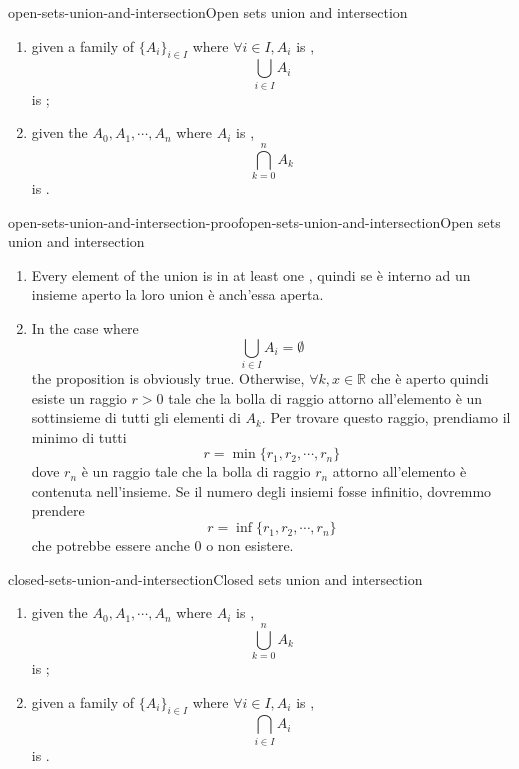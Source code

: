 \documentclass[preview]{standalone}
\begin{document}
\begin{snippetproposition}{open-sets-union-and-intersection}{Open sets union and intersection}
    \begin{enumerate}
        \item given a family of \set[sets] \({\{A_i\}}_{i\in I}\) where \(\forall i \in I, A_i\)
        is ,
        \[
            \bigcup_{i \in I} A_i
        \]
        is ;
        \item given the  \set[sets] \(A_0, A_1, \cdots, A_n\) where \(A_i\)
        is ,
        \[
            \bigcap_{k=0}^n A_k
        \]
        is .
    \end{enumerate}
\end{snippetproposition}

\begin{snippetproof}{open-sets-union-and-intersection-proof}{open-sets-union-and-intersection}{Open sets union and intersection}
    \begin{enumerate}
        \item Every element of the union is in at least one , quindi se è interno
        ad un insieme aperto la loro union è anch'essa aperta.
        \item In the case where
        \[
            \bigcup_{i \in I} A_i = \emptyset
        \]
        the proposition is obviously true.
        Otherwise, \(\forall k, x \in \mathbb{R}\) che è aperto quindi
        esiste un raggio \(r > 0\) tale che la bolla di raggio attorno all'elemento è un sottinsieme di
        tutti gli elementi di \(A_k\). Per trovare questo raggio, prendiamo il minimo di tutti
        \[
            r = \min\{ r_1, r_2, \cdots, r_n \}
        \]
        dove \(r_n\) è un raggio tale che la bolla di raggio \(r_n\) attorno all'elemento
        è contenuta nell'insieme.
        Se il numero degli insiemi fosse infinitio, dovremmo prendere
        \[
            r = \inf\{ r_1, r_2, \cdots, r_n \}
        \]
        che potrebbe essere anche \(0\) o non esistere.
    \end{enumerate}
\end{snippetproof}

\begin{snippetproposition}{closed-sets-union-and-intersection}{Closed sets union and intersection}
    \begin{enumerate}
        \item given the \set[sets] \(A_0, A_1, \cdots, A_n\) where \(A_i\)
        is \closedset[closed],
        \[
            \bigcup_{k=0}^n A_k
        \]
        is \closedset[closed];
        \item given a family of \set[sets] \({\{A_i\}}_{i\in I}\) where \(\forall i \in I, A_i\)
        is \closedset[closed],
        \[
            \bigcap_{i \in I} A_i
        \]
        is \closedset[closed].
    \end{enumerate}
\end{snippetproposition}
\end{document}
